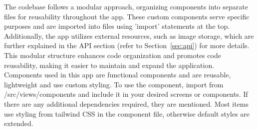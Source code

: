 The codebase follows a modular approach, organizing components into separate files for reusability throughout the app. These custom components serve specific purposes and are imported into files using 'import' statements at the top. Additionally, the app utilizes external resources, such as image storage, which are further explained in the API section (refer to Section~\ref{sec:api}) for more details. This modular structure enhances code organization and promotes code reusability, making it easier to maintain and expand the application.\\
Components used in this app are functional components and are reusable, lightweight and use custom styling. To use the component, import from /src/views/components and include it in your desired screens or components. If there are any additional dependencies required, they are mentioned. Most items use styling from tailwind CSS in the component file, otherwise default styles are extended.
